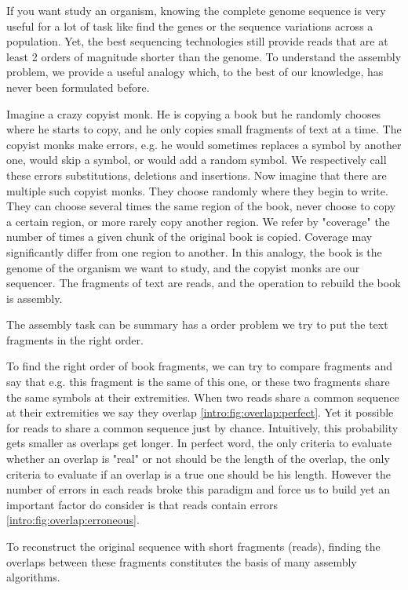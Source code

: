 \documentclass[./main.tex]{subfiles}
\begin{document}
If you want study an organism, knowing the complete genome sequence is very useful for a lot of task like find the genes or the sequence variations across a population. Yet, the best sequencing technologies still provide reads that are at least 2 orders of magnitude shorter than the genome. To understand the assembly problem, we provide a useful analogy which, to the best of our knowledge, has never been formulated before.

Imagine a crazy copyist monk. He is copying a book but he randomly chooses where he starts to copy, and he only copies small fragments of text at a time.
The copyist monks make errors, e.g. he would sometimes replaces a symbol by another one, would skip a symbol, or would add a random symbol. We respectively call these errors substitutions, deletions and insertions.
Now imagine that there are multiple such copyist monks.
They choose randomly where they begin to write. They can choose several times the same region of the book, never choose to copy a certain region, or more rarely copy another region. We refer by "coverage" the number of times a given chunk of the original book is copied. Coverage may significantly differ from one region to another.
In this analogy, the book is the genome of the organism we want to study, and the copyist monks are our sequencer. The fragments of text are reads, and the operation to rebuild the book is assembly.

The assembly task can be summary has a order problem we try to put the text fragments in the right order. 

To find the right order of book fragments, we can try to compare fragments and say that e.g. this fragment is the same of this one, or these two fragments share the same symbols at their extremities. When two reads share a common sequence at their extremities we say they overlap \ref{intro:fig:overlap:perfect}. Yet it possible for reads to share a common sequence just by chance. Intuitively, this probability gets smaller as overlaps get longer. In perfect word, the only criteria to evaluate whether an overlap is "real" or not should be the length of the overlap, the only criteria to evaluate if an overlap is a true one should be his length. However the number of errors in each reads broke this paradigm and force us to build  yet an important factor do consider is that reads contain errors \ref{intro:fig:overlap:erroneous}.

To reconstruct the original sequence with short fragments (reads), finding the overlaps between these fragments constitutes the basis of many assembly algorithms.
\end{document}
